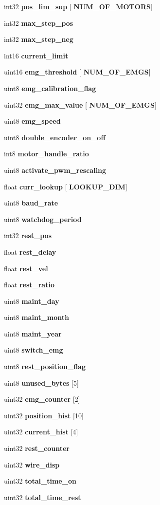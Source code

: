 \begin{DoxyCompactItemize}
\item 
int32 \textbf{ pos\+\_\+lim\+\_\+sup} [\textbf{ N\+U\+M\+\_\+\+O\+F\+\_\+\+M\+O\+T\+O\+RS}]
\item 
int32 \textbf{ max\+\_\+step\+\_\+pos}
\item 
int32 \textbf{ max\+\_\+step\+\_\+neg}
\item 
int16 \textbf{ current\+\_\+limit}
\item 
uint16 \textbf{ emg\+\_\+threshold} [\textbf{ N\+U\+M\+\_\+\+O\+F\+\_\+\+E\+M\+GS}]
\item 
uint8 \textbf{ emg\+\_\+calibration\+\_\+flag}
\item 
uint32 \textbf{ emg\+\_\+max\+\_\+value} [\textbf{ N\+U\+M\+\_\+\+O\+F\+\_\+\+E\+M\+GS}]
\item 
uint8 \textbf{ emg\+\_\+speed}
\item 
uint8 \textbf{ double\+\_\+encoder\+\_\+on\+\_\+off}
\item 
int8 \textbf{ motor\+\_\+handle\+\_\+ratio}
\item 
uint8 \textbf{ activate\+\_\+pwm\+\_\+rescaling}
\item 
float \textbf{ curr\+\_\+lookup} [\textbf{ L\+O\+O\+K\+U\+P\+\_\+\+D\+IM}]
\item 
uint8 \textbf{ baud\+\_\+rate}
\item 
uint8 \textbf{ watchdog\+\_\+period}
\item 
int32 \textbf{ rest\+\_\+pos}
\item 
float \textbf{ rest\+\_\+delay}
\item 
float \textbf{ rest\+\_\+vel}
\item 
float \textbf{ rest\+\_\+ratio}
\item 
uint8 \textbf{ maint\+\_\+day}
\item 
uint8 \textbf{ maint\+\_\+month}
\item 
uint8 \textbf{ maint\+\_\+year}
\item 
uint8 \textbf{ switch\+\_\+emg}
\item 
uint8 \textbf{ rest\+\_\+position\+\_\+flag}
\item 
\mbox{\label{structst__mem_a13769793684b23af8c0cdf6ccf3bd696}} 
uint8 {\bfseries unused\+\_\+bytes} [5]
\item 
uint32 \textbf{ emg\+\_\+counter} [2]
\item 
uint32 \textbf{ position\+\_\+hist} [10]
\item 
uint32 \textbf{ current\+\_\+hist} [4]
\item 
uint32 \textbf{ rest\+\_\+counter}
\item 
uint32 \textbf{ wire\+\_\+disp}
\item 
uint32 \textbf{ total\+\_\+time\+\_\+on}
\item 
uint32 \textbf{ total\+\_\+time\+\_\+rest}
\end{DoxyCompactItemize}


